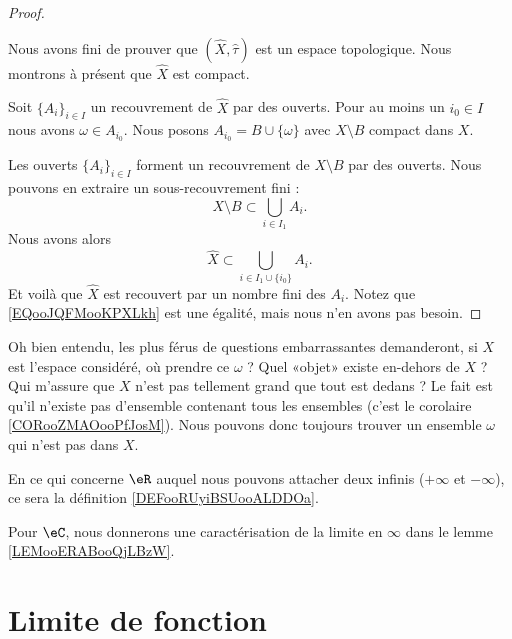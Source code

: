 \begin{proof}
\begin{subproof}
	\end{subproof}
	Nous avons fini de prouver que \( (\hat X, \hat \tau)\) est un espace topologique. Nous montrons à présent que \( \hat X\) est compact.

	Soit \( \{ A_i \}_{i\in I}\) un recouvrement de \( \hat X\) par des ouverts. Pour au moins un \( i_0\in I\) nous avons \( \omega\in A_{i_0}\). Nous posons \( A_{i_0}=B\cup\{ \omega \}\) avec \( X\setminus B\) compact dans \( X\).

	Les ouverts \( \{ A_i \}_{i\in I}\) forment un recouvrement de \( X\setminus B\) par des ouverts. Nous pouvons en extraire un sous-recouvrement fini :
	\begin{equation}
		X\setminus B\subset \bigcup_{i\in I_1}A_i.
	\end{equation}
	Nous avons alors
	\begin{equation}        \label{EQooJQFMooKPXLkh}
		\hat X\subset \bigcup_{i\in I_1\cup\{ i_0 \}}A_i.
	\end{equation}
	Et voilà que \( \hat X\) est recouvert par un nombre fini des \( A_i\). Notez que \eqref{EQooJQFMooKPXLkh} est une égalité, mais nous n'en avons pas besoin.
\end{proof}

\begin{normaltext}
	Oh bien entendu, les plus férus de questions embarrassantes demanderont, si \( X\) est l'espace considéré, où prendre ce \( \omega\) ? Quel «objet» existe en-dehors de \( X\) ? Qui m'assure que \( X\) n'est pas tellement grand que tout est dedans ? Le fait est qu'il n'existe pas d'ensemble contenant tous les ensembles (c'est le corolaire \ref{CORooZMAOooPfJosM}). Nous pouvons donc toujours trouver un ensemble \( \omega\) qui n'est pas dans \( X\).
\end{normaltext}

En ce qui concerne \( \eR\) auquel nous pouvons attacher deux infinis (\( +\infty\) et \( -\infty\)), ce sera la définition \ref{DEFooRUyiBSUooALDDOa}.

Pour \( \eC\), nous donnerons une caractérisation de la limite en \( \infty\) dans le lemme \ref{LEMooERABooQjLBzW}.

\section{Limite de fonction}


